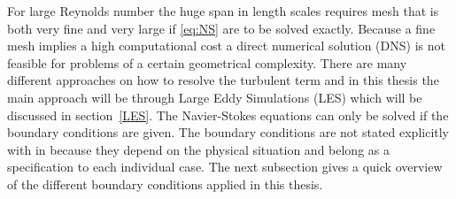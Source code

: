 For large Reynolds number the huge span in length scales requires mesh that is both very fine and very large
if \ref{eq:NS} are to be solved exactly.
Because a fine mesh implies a high computational cost a direct numerical solution (DNS) is not feasible for 
problems of a certain geometrical complexity. There are many different approaches on how to resolve the turbulent term and in 
this thesis the main approach will be through Large Eddy Simulations (LES) which will be discussed 
in section~\ref{LES}. The Navier-Stokes equations can only be solved if the boundary conditions are given. 
The boundary conditions are not stated explicitly with in because they depend on the physical 
situation and belong as a specification to each individual case. The next subsection gives a quick overview of the different 
boundary conditions applied in this thesis.
%
